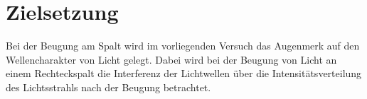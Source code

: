 \section{Zielsetzung}
\label{sec:Zielsetzung}

Bei der Beugung am Spalt wird im vorliegenden Versuch das Augenmerk auf den Wellencharakter von Licht gelegt. Dabei wird bei der Beugung 
von Licht an einem Rechteckspalt die Interferenz der Lichtwellen über die Intensitätsverteilung des Lichtsstrahls nach der Beugung 
betrachtet.

